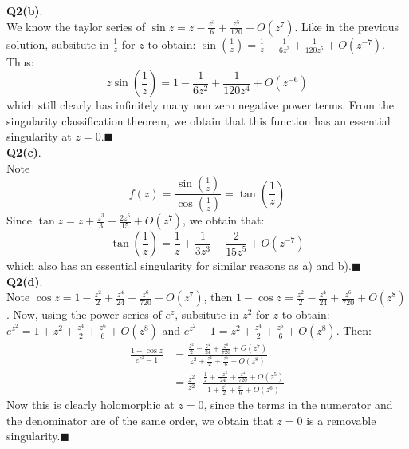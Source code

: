 \documentclass{article}
\begin{document}
    \textbf{Q2(b)}.\\
    We know the taylor series of $\sin{z} = z - \frac{z^3}{6} + \frac{z^5}{120} + O(z^7)$. Like in the previous solution,
    subsitute in $\frac{1}{z}$ for $z$ to obtain: $\sin{(\frac{1}{z})} = \frac{1}{z} - \frac{1}{6z^3} + \frac{1}{120z^5} + O(z^{-7})$.
    Thus:
    \[ z\sin{(\frac{1}{z})} = 1 - \frac{1}{6z^2} + \frac{1}{120z^4} + O(z^{-6}) \]
    which still clearly has infinitely many non zero negative power terms. From the singularity classification theorem, we obtain
    that this function has an essential singularity at $z=0$.\hfill$\blacksquare$\\

    \textbf{Q2(c)}.\\
    Note 
    \[ f(z) = \frac{\sin{(\frac{1}{z})}}{\cos{(\frac{1}{z})}} = \tan{(\frac{1}{z})} \]
    Since $\tan{z} = z + \frac{z^3}{3} + \frac{2z^5}{15} + O(z^7)$, we obtain that:
    \[ \tan{(\frac{1}{z})} = \frac{1}{z} + \frac{1}{3z^3} + \frac{2}{15z^5} + O(z^{-7}) \]
    which also has an essential singularity for similar reasons as a) and b).\hfill$\blacksquare$\\

    \textbf{Q2(d)}.\\
    Note $\cos{z} = 1 - \frac{z^2}{2} + \frac{z^4}{24} - \frac{z^6}{720} + O(z^7)$, then $1-\cos{z} = \frac{z^2}{2} - \frac{z^4}{24} +
    \frac{z^6}{720} + O(z^8)$. Now, using the power series of $e^z$, subsitute in $z^2$ for $z$ to obtain:
    $e^{z^2} = 1 + z^2 + \frac{z^4}{2} + \frac{z^6}{6} + O(z^8)$ and $e^{z^2} - 1 = z^2 + \frac{z^4}{2} + \frac{z^6}{6} + O(z^8)$.
    Then:
    \begin{align*}
        \frac{1-\cos{z}}{e^{z^2}-1} &= \frac{\frac{z^2}{2}-\frac{z^4}{24}+\frac{z^6}{720}+O(z^7)}{z^2+\frac{z^4}{2}+\frac{z^6}{6} 
            + O(z^8)}\\
        &= \frac{z^2}{z^2}\cdot\frac{\frac{1}{2} + \frac{-z^2}{24}+\frac{z^4}{720}+O(z^5)}{1+\frac{z^2}{2}+\frac{z^4}{6}+O(z^6)}
    \end{align*}
    Now this is clearly holomorphic at $z=0$, since the terms in the numerator and the denominator are of the same order, we obtain
    that $z=0$ is a removable singularity.\hfill$\blacksquare$\\
\end{document}
